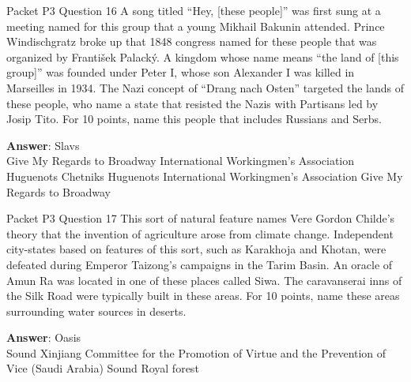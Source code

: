 \begin{frame}{Packet P3 Question 16}
A song titled “Hey, [these   people]” was first sung at a meeting named for this group that a young Mikhail Bakunin attended. Prince Windischgratz broke up that 1848 congress named for these people that was organized by František Palacký. A kingdom whose name means “the land of [this group]” was founded under Peter I, whose   son Alexander I was killed in Marseilles in 1934. The Nazi   concept of “Drang nach Osten” targeted the lands of these people, who name a state that resisted the Nazis with Partisans led by Josip Tito. For 10 points, name this people that includes Russians and Serbs.        

\textbf{Answer}: Slavs\\
 Give My Regards to Broadway
 International Workingmen's Association
 Huguenots
 Chetniks
 Huguenots
 International Workingmen's Association
 Give My Regards to Broadway
\end{frame}

\begin{frame}{Packet P3 Question 17}
This sort of natural feature   names Vere Gordon Childe’s theory that the invention of agriculture arose from climate change. Independent city-states based on features of this sort, such as Karakhoja and Khotan, were defeated during Emperor Taizong’s campaigns in the Tarim Basin. An oracle of Amun Ra was located in one of these places called Siwa. The caravanserai inns of the Silk Road were typically built in these areas. For 10 points, name these areas surrounding water sources in deserts.        

\textbf{Answer}: Oasis\\
 Sound
 Xinjiang
 Committee for the Promotion of Virtue and the Prevention of Vice (Saudi Arabia)
 Sound
 Royal forest
\end{frame}

